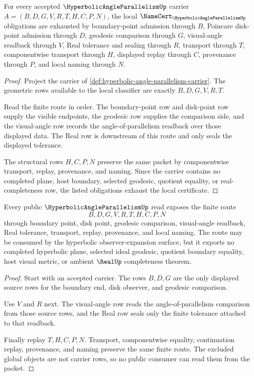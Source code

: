 \begin{theorem}
\label{thm:hyperbolic-angle-parallelism-namecert-obligations}
For every accepted $\HyperbolicAngleParallelismUp$ carrier $A=(B,D,G,V,R,T,H,C,P,N)$, the local $\NameCert_{\HyperbolicAngleParallelismUp}$ obligations are exhausted by boundary-point admission through $B$, Poincare disk-point admission through $D$, geodesic comparison through $G$, visual-angle readback through $V$, Real tolerance and sealing through $R$, transport through $T$, componentwise transport through $H$, displayed replay through $C$, provenance through $P$, and local naming through $N$.
\end{theorem}
\begin{proof}
Project the carrier of \autoref{def:hyperbolic-angle-parallelism-carrier}. The geometric rows available to the local classifier are exactly $B,D,G,V,R,T$.

Read the finite route in order. The boundary-point row and disk-point row supply the visible endpoints, the geodesic row supplies the comparison side, and the visual-angle row records the angle-of-parallelism readback over those displayed data. The Real row is downstream of this route and only seals the displayed tolerance.

The structural rows $H,C,P,N$ preserve the same packet by componentwise transport, replay, provenance, and naming. Since the carrier contains no completed plane, host boundary, selected geodesic, quotient equality, or real-completeness row, the listed obligations exhaust the local certificate.
\end{proof}

\begin{theorem}
\label{thm:hyperbolic-angle-parallelism-finite-route}
Every public $\HyperbolicAngleParallelismUp$ read exposes the finite route
$$
B,D,G,V,R,T,H,C,P,N
$$
through boundary point, disk point, geodesic comparison, visual-angle readback, Real tolerance, transport, replay, provenance, and local naming. The route may be consumed by the hyperbolic observer-expansion surface, but it exports no completed hyperbolic plane, selected ideal geodesic, quotient boundary equality, host visual metric, or ambient $\RealUp$ completeness theorem.
\end{theorem}
\begin{proof}
Start with an accepted carrier. The rows $B,D,G$ are the only displayed source rows for the boundary end, disk observer, and geodesic comparison.

Use $V$ and $R$ next. The visual-angle row reads the angle-of-parallelism comparison from those source rows, and the Real row seals only the finite tolerance attached to that readback.

Finally replay $T,H,C,P,N$. Transport, componentwise equality, continuation replay, provenance, and naming preserve the same finite route. The excluded global objects are not carrier rows, so no public consumer can read them from the packet.
\end{proof}


